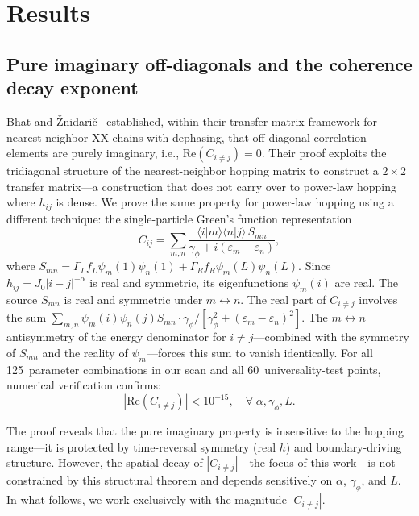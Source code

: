 \documentclass[aps,prd,twocolumn,superscriptaddress,floatfix]{revtex4-2}
\begin{document}
\section{Results}

\subsection{Pure imaginary off-diagonals and the coherence decay exponent}

Bhat and \v{Z}nidari\v{c}~\cite{Bhat2025} established, within their
transfer matrix framework for nearest-neighbor XX chains with
dephasing, that off-diagonal correlation elements are purely
imaginary, i.e., $\text{Re}(C_{i\neq j})=0$. Their proof exploits the
tridiagonal structure of the nearest-neighbor hopping matrix to
construct a $2\times2$ transfer matrix---a construction that does not
carry over to power-law hopping where $h_{ij}$ is dense. We prove the
same property for power-law hopping using a different technique: the
single-particle Green's function representation
\begin{equation}
C_{ij} = \sum_{m,n}
\frac{\langle i|m\rangle \langle n|j\rangle \, S_{mn}}
{\gamma_\phi + i(\varepsilon_m - \varepsilon_n)},
\label{eq:Greens}
\end{equation}
where $S_{mn} = \Gamma_L f_L \psi_m(1)\psi_n(1)
+ \Gamma_R f_R \psi_m(L)\psi_n(L)$. Since $h_{ij} = J_0|i-j|^{-\alpha}$
is real and symmetric, its eigenfunctions $\psi_m(i)$ are real. The
source $S_{mn}$ is real and symmetric under $m \leftrightarrow n$. The
real part of $C_{i\neq j}$ involves the sum
$\sum_{m,n} \psi_m(i)\psi_n(j) S_{mn}
\cdot \gamma_\phi/[\gamma_\phi^2+(\varepsilon_m-\varepsilon_n)^2]$. The
$m\leftrightarrow n$ antisymmetry of the energy denominator for
$i\neq j$---combined with the symmetry of $S_{mn}$ and the reality of
$\psi_m$---forces this sum to vanish identically. For all 125~parameter
combinations in our scan and all 60~universality-test points,
numerical verification confirms:
\begin{equation}
|\text{Re}(C_{i\neq j})| < 10^{-15},
\quad \forall\; \alpha, \gamma_\phi, L.
\label{eq:pure_imaginary}
\end{equation}

The proof reveals that the pure imaginary property is insensitive to
the hopping range---it is protected by time-reversal symmetry (real
$h$) and boundary-driving structure. However, the spatial decay of
$|C_{i\neq j}|$---the focus of this work---is not constrained by this
structural theorem and depends sensitively on $\alpha$, $\gamma_\phi$,
and $L$. In what follows, we work exclusively with the magnitude
$|C_{i\neq j}|$.
\end{document}
